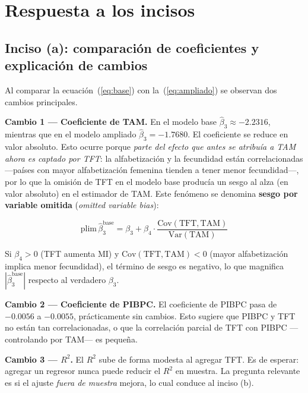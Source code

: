 \documentclass[12pt, letterpaper]{article}
\newcommand{\betahat}{\hat{\beta}}
\begin{document}
\section{Respuesta a los incisos}

\subsection{Inciso (a): comparación de coeficientes y explicación de cambios}

Al comparar la ecuación~(\ref{eq:base}) con la~(\ref{eq:ampliado}) se observan
dos cambios principales.

\medskip
\noindent\textbf{Cambio 1 — Coeficiente de TAM.}\quad
En el modelo base $\betahat_3 \approx -2.2316$, mientras que en el modelo ampliado
$\betahat_3 = -1.7680$. El coeficiente se reduce en valor absoluto. Esto ocurre
porque \emph{parte del efecto que antes se atribuía a TAM ahora es captado por TFT}:
la alfabetización y la fecundidad están correlacionadas —países con mayor
alfabetización femenina tienden a tener menor fecundidad—, por lo que la omisión
de TFT en el modelo base producía un sesgo al alza (en valor absoluto) en el
estimador de TAM. Este fenómeno se denomina \textbf{sesgo por variable omitida}
(\textit{omitted variable bias}):

\begin{equation}
  \text{plim}\,\hat{\beta}_3^{\text{base}}
  = \beta_3
  + \beta_4 \cdot \frac{\text{Cov}(\text{TFT},\text{TAM})}{\text{Var}(\text{TAM})}
  \label{eq:sesgo}
\end{equation}

\noindent Si $\beta_4 > 0$ (TFT aumenta MI) y $\text{Cov}(\text{TFT},\text{TAM}) < 0$
(mayor alfabetización implica menor fecundidad), el término de sesgo es negativo,
lo que magnifica $|\hat{\beta}_3^{\text{base}}|$ respecto al verdadero $\beta_3$.

\medskip
\noindent\textbf{Cambio 2 — Coeficiente de PIBPC.}\quad
El coeficiente de PIBPC pasa de $-0.0056$ a $-0.0055$, prácticamente sin cambios.
Esto sugiere que PIBPC y TFT no están tan correlacionadas, o que la correlación
parcial de TFT con PIBPC —controlando por TAM— es pequeña.

\medskip
\noindent\textbf{Cambio 3 — $R^2$.}\quad
El $R^2$ sube de forma modesta al agregar TFT. Es de esperar: agregar un regresor
nunca puede reducir el $R^2$ en muestra. La pregunta relevante es si el ajuste
\emph{fuera de muestra} mejora, lo cual conduce al inciso (b).
\end{document}
